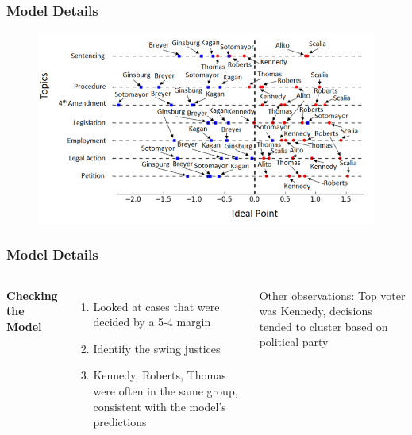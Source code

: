 \documentclass{beamer}
\begin{document}
\begin{frame}
\frametitle{Model Details}


\begin{figure}[h]
\begin{center}
\includegraphics[width=1.0\columnwidth]{model_visual}
\end{center}
\end{figure}


\end{frame}



\begin{frame}
\frametitle{Model Details}
\begin{columns}[c] %

\textbf{Checking the Model}
\begin{enumerate}
\item Looked at cases that were decided by a 5-4 margin
\item Identify the swing justices
\item Kennedy, Roberts, Thomas were often in the same group, consistent with the model's predictions
\end{enumerate}

Other observations: Top voter was Kennedy, decisions tended to cluster based on political party

\end{columns}
\end{frame}

\end{document}
